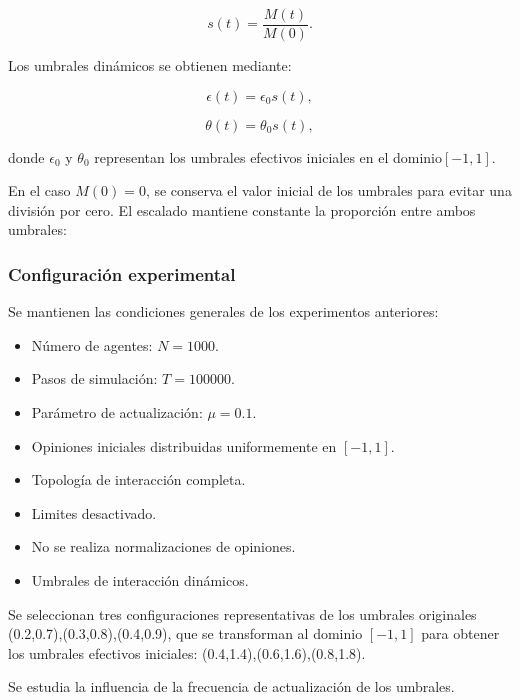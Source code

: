 \documentclass[11pt,a4paper]{article}
\begin{document}
\begin{equation}
    s(t)=\frac{M(t)}{M(0)}.
\end{equation}

Los umbrales dinámicos se obtienen mediante:

\begin{equation}
    \epsilon(t)=\epsilon_0 s(t),
    \label{eq:exp07_epsilon}
\end{equation}

\begin{equation}
    \theta(t)=\theta_0 s(t),
    \label{eq:exp07_theta}
\end{equation}

donde $\epsilon_0$ y $\theta_0$ representan los umbrales efectivos iniciales en el dominio$[-1,1]$.

En el caso $M(0)=0$, se conserva el valor inicial de los umbrales para evitar una división por cero.
El escalado mantiene constante la proporción entre ambos umbrales:


\subsubsection{Configuración experimental}

Se mantienen las condiciones generales de los experimentos anteriores:

\begin{itemize}

    \item Número de agentes: $N=1000$.
    \item Pasos de simulación: $T=100000$.
    \item Parámetro de actualización: $\mu=0.1$.
    \item Opiniones iniciales distribuidas uniformemente en $[-1,1]$.
    \item Topología de interacción completa.
    \item Limites desactivado.
    \item No se realiza normalizaciones de opiniones.
    \item Umbrales de interacción dinámicos.

\end{itemize}

Se seleccionan tres configuraciones representativas de los umbrales originales (0.2,0.7),(0.3,0.8),(0.4,0.9), que se transforman al dominio $[-1,1]$ para obtener los umbrales efectivos iniciales: (0.4,1.4),(0.6,1.6),(0.8,1.8).

Se estudia la influencia de la frecuencia de actualización de los umbrales.
\end{document}
